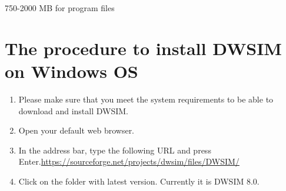 \documentclass[a4paper,12pt]{article}
\begin{document}
750-2000 MB for program files

\section{The procedure to install DWSIM on Windows OS}

\begin{enumerate}
\item Please make sure that you meet the system requirements to be able to download and install DWSIM.
\item Open your default web browser.
\item In the address bar, type the following URL and press Enter.\newline \url{https://sourceforge.net/projects/dwsim/files/DWSIM/}

\item Click on the folder with latest version. Currently it is DWSIM 8.0.


\end{enumerate}
\end{document}
